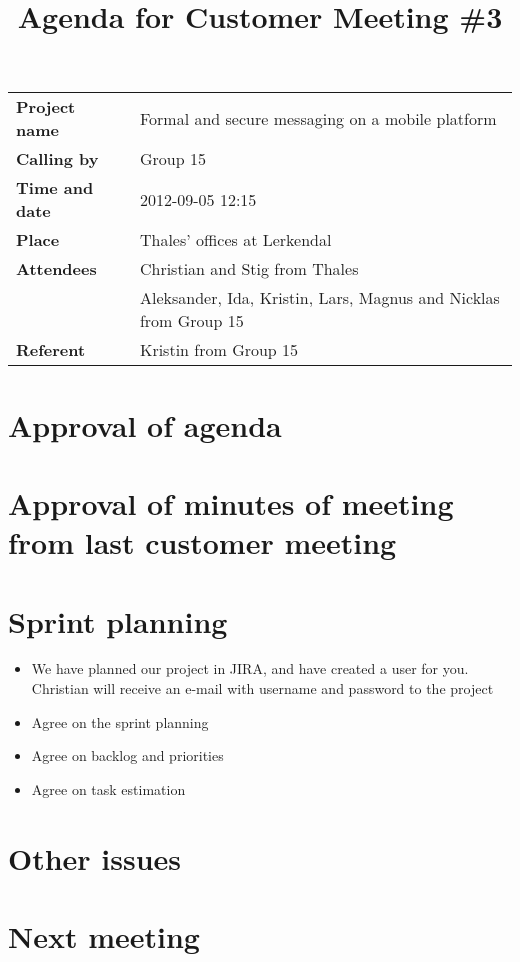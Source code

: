 \documentclass[a4paper,12pt]{article}
\begin{document}
\title{Agenda for Customer Meeting \#3}
\maketitle
\begin{tabular}{>{\bfseries}l l}	
Project name&Formal and secure messaging on a mobile platform\\
Calling by&Group 15\\
Time and date&2012-09-05 12:15\\
Place&Thales' offices at Lerkendal\\
Attendees&Christian and Stig from Thales\\
& Aleksander, Ida, Kristin, Lars, Magnus and Nicklas from Group 15 \\
Referent&Kristin from Group 15\\
\end{tabular}

\section{Approval of agenda}
\section{Approval of minutes of meeting from last customer meeting}
\section{Sprint planning}
\begin{itemize}
\item
We have planned our project in JIRA, and have created a user for you.
Christian will receive an e-mail with username and password to the project
\item
Agree on the sprint planning
\item
Agree on backlog and priorities
\item
Agree on task estimation
\end{itemize}
\section{Other issues}
\section{Next meeting}
\end{document}
